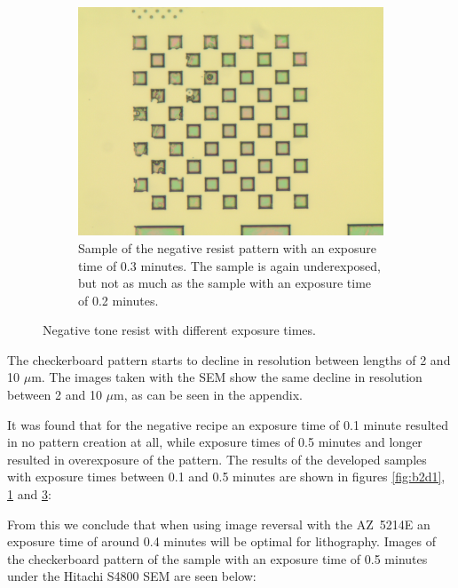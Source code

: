 \begin{figure}[!b]
\begin{subfigure}[t]{0.3\linewidth}
	    \label{fig:b2h1}
    \end{subfigure}
    \hfill
    \begin{subfigure}[t]{0.3\linewidth}
        \centering
        \includegraphics[width=\textwidth]{data/b2i1.jpg}
	    \caption{Sample of the negative resist pattern with an exposure time of 0.3 minutes. The sample is again underexposed, but not as much as the sample with an exposure time of 0.2 minutes.}
	    \label{fig:b2i1}
    \end{subfigure}
    \caption{Negative tone resist with different exposure times.}
\end{figure}

The checkerboard pattern starts to decline in resolution between lengths of 2 and 10 $\mu$m. The images taken with the SEM show the same decline in resolution between 2 and 10 $\mu$m, as can be seen in the appendix.


It was found that for the negative recipe an exposure time of 0.1 minute resulted in no pattern creation at all, while exposure times of 0.5 minutes and longer resulted in overexposure of the pattern. The results of the developed samples with exposure times between 0.1 and 0.5 minutes are shown in figures \ref{fig:b2d1}, \ref{fig:b2h1} and \ref{fig:b2i1}:


From this we conclude that when using image reversal with the AZ~5214E an exposure time of around 0.4 minutes will be optimal for lithography. Images of the checkerboard pattern of the sample with an exposure time of 0.5 minutes under the Hitachi S4800 SEM are seen below:


